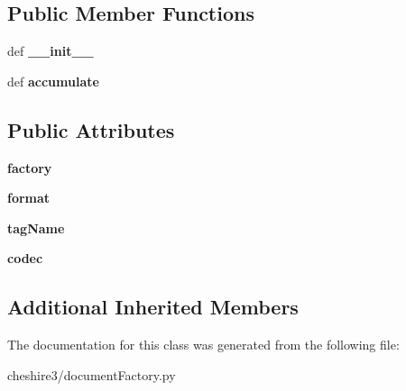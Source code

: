 \subsection*{Public Member Functions}
\begin{DoxyCompactItemize}
\item 
\hypertarget{classcheshire3_1_1document_factory_1_1_accumulating_stream_a46670153350ce7dffce8bc7f412d4808}{def {\bfseries \-\_\-\-\_\-init\-\_\-\-\_\-}}\label{classcheshire3_1_1document_factory_1_1_accumulating_stream_a46670153350ce7dffce8bc7f412d4808}

\item 
\hypertarget{classcheshire3_1_1document_factory_1_1_accumulating_stream_a13175eb6528e0d98f5fe31a346e85007}{def {\bfseries accumulate}}\label{classcheshire3_1_1document_factory_1_1_accumulating_stream_a13175eb6528e0d98f5fe31a346e85007}

\end{DoxyCompactItemize}
\subsection*{Public Attributes}
\begin{DoxyCompactItemize}
\item 
\hypertarget{classcheshire3_1_1document_factory_1_1_accumulating_stream_aaab6f28ebc972573493e0145dd411674}{{\bfseries factory}}\label{classcheshire3_1_1document_factory_1_1_accumulating_stream_aaab6f28ebc972573493e0145dd411674}

\item 
\hypertarget{classcheshire3_1_1document_factory_1_1_accumulating_stream_aa711b56f4daedfad2a5212ca373731be}{{\bfseries format}}\label{classcheshire3_1_1document_factory_1_1_accumulating_stream_aa711b56f4daedfad2a5212ca373731be}

\item 
\hypertarget{classcheshire3_1_1document_factory_1_1_accumulating_stream_abbef565c2d574833b1bb54c7a329cc44}{{\bfseries tag\-Name}}\label{classcheshire3_1_1document_factory_1_1_accumulating_stream_abbef565c2d574833b1bb54c7a329cc44}

\item 
\hypertarget{classcheshire3_1_1document_factory_1_1_accumulating_stream_a43df23d4ad828c6975b7c4fae90746b6}{{\bfseries codec}}\label{classcheshire3_1_1document_factory_1_1_accumulating_stream_a43df23d4ad828c6975b7c4fae90746b6}

\end{DoxyCompactItemize}
\subsection*{Additional Inherited Members}


The documentation for this class was generated from the following file\-:\begin{DoxyCompactItemize}
\item 
cheshire3/document\-Factory.\-py\end{DoxyCompactItemize}

